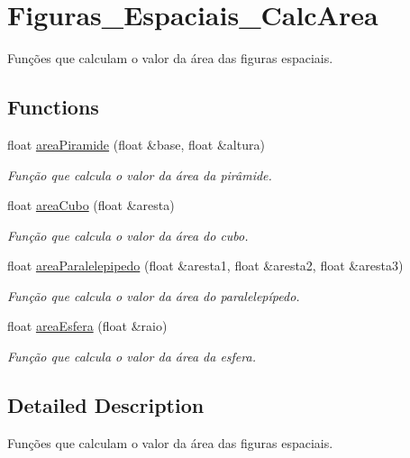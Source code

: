 \hypertarget{group__Figuras__Espaciais__CalcArea}{}\section{Figuras\+\_\+\+Espaciais\+\_\+\+Calc\+Area}
\label{group__Figuras__Espaciais__CalcArea}


Funções que calculam o valor da área das figuras espaciais.  


\subsection*{Functions}
\begin{DoxyCompactItemize}
\item 
float \hyperlink{group__Figuras__Espaciais__CalcArea_ga10226ad45447d70353626a01897d1b06}{area\+Piramide} (float \&base, float \&altura)
\begin{DoxyCompactList}\small\item\em Função que calcula o valor da área da pirâmide. \end{DoxyCompactList}\item 
float \hyperlink{group__Figuras__Espaciais__CalcArea_gab519a0d997044a93085abaaaf6270ab5}{area\+Cubo} (float \&aresta)
\begin{DoxyCompactList}\small\item\em Função que calcula o valor da área do cubo. \end{DoxyCompactList}\item 
float \hyperlink{group__Figuras__Espaciais__CalcArea_gaff7dfecfa742b07c8e8e243325d95117}{area\+Paralelepipedo} (float \&aresta1, float \&aresta2, float \&aresta3)
\begin{DoxyCompactList}\small\item\em Função que calcula o valor da área do paralelepípedo. \end{DoxyCompactList}\item 
float \hyperlink{group__Figuras__Espaciais__CalcArea_ga2d0b18f7e5391dd6a8bff93bb679171a}{area\+Esfera} (float \&raio)
\begin{DoxyCompactList}\small\item\em Função que calcula o valor da área da esfera. \end{DoxyCompactList}\end{DoxyCompactItemize}


\subsection{Detailed Description}
Funções que calculam o valor da área das figuras espaciais. 



